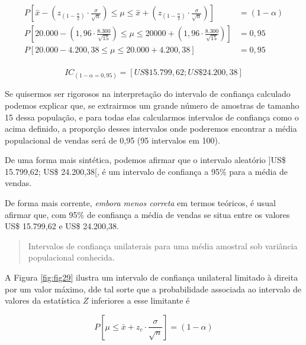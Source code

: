 \documentclass[
]{book}
\begin{document}
\hfill\break

\begin{align*}
P[\stackrel{-}{x}-({z}_{(1-\frac{\alpha }{2})} \cdot \frac{\sigma}{\sqrt{n}}) \le \mu \le \stackrel{-}{x}+({z}_{(1-\frac{\alpha }{2})} \cdot \frac{\sigma}{\sqrt{n}})     ] & = (1-\alpha) \\
P[20.000 - (1,96 \cdot \frac{8.300}{\sqrt{15}})  \le \mu \le 20000 + (      1,96 \cdot \frac{8.300}{\sqrt{15}})     ] & = 0,95 \\
P[20.000 - 4.200,38   \le \mu \le 20.000 + 4.200,38 ] & = 0,95 \\
\end{align*}

\hfill\break

\[
IC_{(1-\alpha=0,95)} = [US\$ 15.799,62; US\$ 24.200,38]
\]

\hfill\break

Se quisermos ser rigorosos na interpretação do intervalo de confiança calculado podemos explicar que, se extrairmos um grande número de amostras de tamanho 15 dessa população, e para todas elas calcularmos intervalos de confiança como o acima definido, a proporção desses intervalos onde poderemos encontrar a média populacional de vendas será de 0,95 (95 intervalos em 100).

\hfill\break

De uma forma mais sintética, podemos afirmar que o intervalo aleatório {]}US\$ 15.799,62; US\$ 24.200,38{[}, é um intervalo de confiança a 95\% para a média de vendas.

\hfill\break

De forma mais corrente, \emph{embora menos correta} em termos teóricos, é usual afirmar que, com 95\% de confiança a média de vendas se situa entre os valores US\$ 15.799,62 e US\$ 24.200,38.

\hfill\break

\begin{quote}
Intervalos de confiança unilaterais para uma média amostral sob variância populacional conhecida.
\end{quote}

\hfill\break

A Figura \ref{fig:fig29} ilustra um intervalo de confiança unilateral limitado à direita por um valor máximo, dde tal sorte que a probabilidade associada ao intervalo de valores da estatística \(Z\) inferiores a esse limitante é

\hfill\break

\[
P\left [\mu \le \bar{x} + {z}_{c} \cdot  \frac{\sigma}{\sqrt{n}} \right ] = (1- \alpha)
\]
\end{document}
